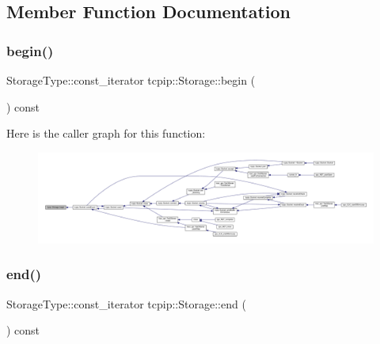 \subsection{Member Function Documentation}
\mbox{\label{classtcpip_1_1_storage_a0e6208feb041731abbdb595085f29394}} 
\subsubsection{\texorpdfstring{begin()}{begin()}}
{\footnotesize\ttfamily Storage\+Type\+::const\+\_\+iterator tcpip\+::\+Storage\+::begin (\begin{DoxyParamCaption}{ }\end{DoxyParamCaption}) const\hspace{0.3cm}{\ttfamily [inline]}}

Here is the caller graph for this function\+:
\nopagebreak
\begin{figure}[H]
\begin{center}
\leavevmode
\includegraphics[width=350pt]{classtcpip_1_1_storage_a0e6208feb041731abbdb595085f29394_icgraph}
\end{center}
\end{figure}
\mbox{\label{classtcpip_1_1_storage_a42a2fec87e26a5a90f56e3d8201559e1}} 
\subsubsection{\texorpdfstring{end()}{end()}}
{\footnotesize\ttfamily Storage\+Type\+::const\+\_\+iterator tcpip\+::\+Storage\+::end (\begin{DoxyParamCaption}{ }\end{DoxyParamCaption}) const\hspace{0.3cm}{\ttfamily [inline]}}

